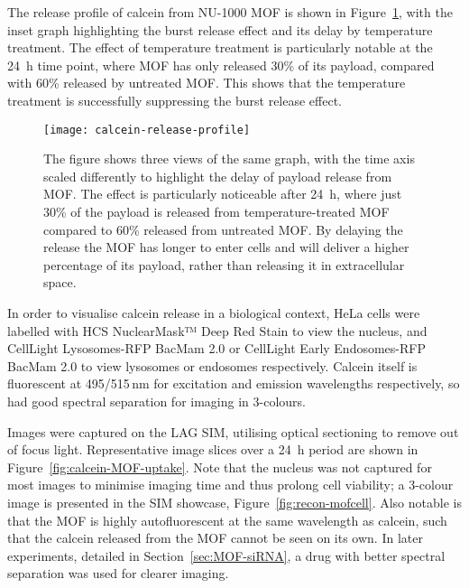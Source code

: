 The release profile of calcein from NU-1000 MOF is shown in Figure~\ref{fig:calcein-release-profile}, with the inset graph highlighting the burst release effect and its delay by temperature treatment. 
The effect of temperature treatment is particularly notable at the \SI{24}{\hour} time point, where MOF has only released 30\% of its payload, compared with 60\% released by untreated MOF.
This shows that the temperature treatment is successfully suppressing the burst release effect. 
 
\begin{figure}[htbp!]
\centering
\texttt{[image: calcein-release-profile]}
\caption[MOFs: Payload release is delayed by temperature treatment]{ The figure shows three views of the same graph, with the time axis scaled differently to highlight the delay of payload release from MOF. The effect is particularly noticeable after \SI{24}{\hour}, where just 30\% of the payload is released from temperature-treated MOF compared to 60\% released from untreated MOF. By delaying the release the MOF has longer to enter cells and will deliver a higher percentage of its payload, rather than releasing it in extracellular space. }
\label{fig:calcein-release-profile}
\end{figure}

In order to visualise calcein release in a biological context, HeLa cells were labelled with HCS NuclearMask™ Deep Red Stain to view the nucleus, and CellLight Lysosomes-RFP BacMam 2.0 or CellLight Early Endosomes-RFP BacMam 2.0 to view lysosomes or endosomes respectively. 
Calcein itself is fluorescent at 495/515\,\si{\nano\meter} for excitation and emission wavelengths respectively, so had good spectral separation for imaging in 3-colours. %

Images were captured on the LAG SIM, utilising optical sectioning to remove out of focus light. 
Representative image slices over a \SI{24}{\hour} period are shown in Figure~\ref{fig:calcein-MOF-uptake}. 
Note that the nucleus was not captured for most images to minimise imaging time and thus prolong cell viability; a 3-colour image is presented in the SIM showcase, Figure~\ref{fig:recon-mofcell}. 
Also notable is that the MOF is highly autofluorescent at the same wavelength as calcein, such that the calcein released from the MOF cannot be seen on its own. 
In later experiments, detailed in Section~\ref{sec:MOF-siRNA}, a drug with better spectral separation was used for clearer imaging.


